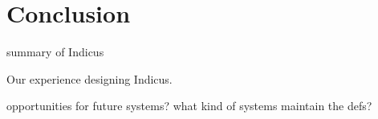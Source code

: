 \section{Conclusion}
\label{section:conc}

summary of Indicus

Our experience designing Indicus.

opportunities for future systems? what kind of systems maintain the defs?